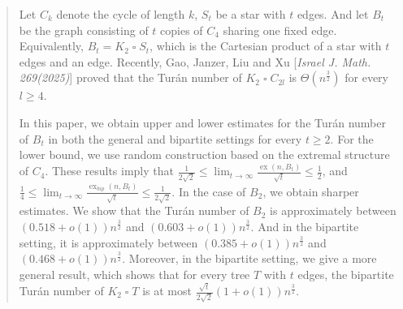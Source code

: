 \documentclass[11pt,a4paper]{article}
\theoremstyle{definition}
\DeclareMathOperator{\ex}{ex}
\begin{document}
    \begin{abstract}
        
        Let $C_k$ denote the cycle of length $k$, $S_t$ be a star with $t$ edges. And
        let $B_t$ be the graph consisting of $t$ copies of $C_4$ sharing one fixed edge.  Equivalently, $B_t=K_2 \mathbin{\square} S_t$, which is the Cartesian product of a star with $t$ edges and an edge.
        Recently, Gao, Janzer, Liu and Xu [\textit{Israel J. Math. 269(2025)}] proved that the Tur\'an number of $K_2\mathbin{\square} C_{2l}$ is $\Theta(n^{\frac{3}{2}})$ for every $l\ge 4$.

        In this paper, we obtain upper and lower estimates for the Tur\'an number of $B_t$ in both the general and bipartite settings for every $t\geq 2$.
        For the lower bound, we use random construction based on the extremal structure of $C_4$.
        These results imply that
        $\frac{1}{2\sqrt{2}}\leq \lim_{t\to \infty} \frac{\ex(n,B_t)}{\sqrt{t}}\leq \frac{1}{2}$, and $\frac{1}{4}\leq \lim_{t\to \infty} \frac{\ex_{bip}(n,B_t)}{\sqrt{t}}\leq \frac{1}{2\sqrt{2}}.$
        In the case of $B_2$, we obtain sharper estimates.
        We show that the Tur\'an number of $B_2$ is approximately between $(0.518+o(1))n^{\frac{3}{2}}$ and $(0.603+o(1))n^{\frac{3}{2}}$.
        And in the bipartite setting, it is approximately between
        $(0.385+o(1))n^{\frac{3}{2}}$ and $(0.468+o(1))n^{\frac{3}{2}}$.
        Moreover,
        in the bipartite setting, we give a more general result, which shows that for every tree $T$ with $t$ edges, the bipartite Tur\'an number of $K_2\mathbin{\square}T$ is at most $\frac{\sqrt{t}}{2\sqrt{2}}(1+o(1))n^{\frac{3}{2}}$.
    \end{abstract}
\end{document}
